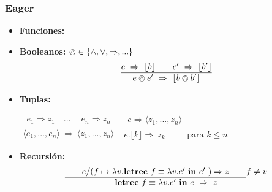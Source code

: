     \subsubsection{Eager}
      \begin{itemize}
        \item \textbf{Funciones:}
          \begin{prooftree}
          \end{prooftree}
        \item \textbf{Booleanos:} $\owedge \in \{\wedge, \vee, \Rightarrow,...\}$
          \[\begin{array}{c}
          \underline{e\ \Rightarrow\ \lfloor b\rfloor\qquad e'\ \Rightarrow\ \lfloor b'\rfloor}\\
          e \owedge e'\ \Rightarrow\ \lfloor b \owedge b'\rfloor
          \end{array}\]
          \pagebreak
        \item \textbf{Tuplas:}
          \begin{multicols}{2}
            $\begin{array}{c}
              \underline{\ \ e_1 \Rightarrow z_1 \quad ... \quad \ e_n \Rightarrow z_n } \\
              \langle e_1,...,e_n\rangle\ \Rightarrow\ \langle z_1,...,z_n\rangle
            \end{array}$
            $\begin{array}{c}
              \underline{\ \ e \Rightarrow \langle z_1,...,z_n\rangle} \qquad \qquad \qquad \qquad \\
              e.\lfloor k\rfloor \Rightarrow\ z_k \qquad \ \text{ para } k \leq n
            \end{array}$
          \end{multicols}
        \item \textbf{Recursión:}
          \[\begin{array}{c}
            \underline{\qquad e/(f\mapsto \lambda v.\letrecin{f \equiv \lambda v.e'}{e'})
            \Rightarrow z\qquad } f \neq v\\
            \letrecin{f \equiv \lambda v.e'}{e} \Rightarrow \ z
          \end{array}\]
      \end{itemize}

